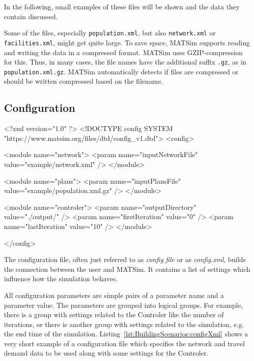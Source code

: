 In the following, small examples of these files will be shown and the data they
contain discussed.

\begin{note}
Some of the files, especially {\tt population.xml}, but also {\tt network.xml} 
or {\tt facilities.xml}, might get quite large. To save space, MATSim supports
reading and writing the data in a compressed format. MATSim uses  
GZIP-compression for this. Thus, in many cases, the file names have the 
additional suffix {\tt .gz}, as in {\tt population.xml.gz}. MATSim automatically
detects if files are compressed or should be written compressed based on the 
filename.
\end{note}

\subsection{Configuration}

\begin{xml-file}[caption=An example of a config.xml,
label=lst:BuildingScenarios:configXml]
<?xml version="1.0" ?>
<!DOCTYPE config SYSTEM "https://www.matsim.org/files/dtd/config_v1.dtd">
<config>

	<module name="network">
		<param name="inputNetworkFile" value="example/network.xml" />
	</module>

	<module name="plans">
		<param name="inputPlansFile" value="example/population.xml.gz" />
	</module>

	<module name="controler">
		<param name="outputDirectory" value="./output/" />
		<param name="firstIteration" value="0" />
		<param name="lastIteration" value="10" />
	</module>
	
</config>
\end{xml-file}

The configuration file, often just referred to as \emph{config file}
or as \emph{config.xml}, builds the connection between the user and MATSim.
It contains a list of settings which influence how the simulation behaves.

All configuration parameters are simple pairs of a parameter name and a
parameter value. The parameters are grouped into logical groups. For example,
there is a group with settings related to the Controler like the number of
iterations, or there is another group with settings related to the simulation,
e.g. the end time of the simulation.
Listing~\ref{lst:BuildingScenarios:configXml} shows a very short example of a
configuration file which specifies the network and travel demand data to be used
along with some settings for the Controler.

